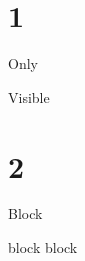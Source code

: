 \documentclass{beamer}
\begin{document}
\begin{frame}
\titlepage
\end{frame}
\section{1}
\begin{frame}{Only}


\end{frame}

\begin{frame}{Visible}


\end{frame}
\section{2}
\begin{frame}{Block}
\begin{block}{block}
block
\end{block}
\end{frame}
\end{document}
